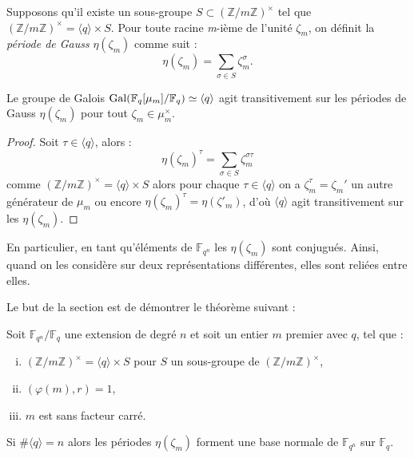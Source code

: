 \documentclass[a4paper]{article} %
\numberwithin{section}{part}
\numberwithin{equation}{section}
\newcommand\nroot[1]{\textit{#1}-ième}
\newcommand\zmodninv[1]{(\mathbb{Z}/#1\mathbb{Z})^{\times}}
\newcommand\GF[1]{\mathbb{F}_{#1}}
\newcommand\groupgen[1]{\langle{#1}\rangle}
\begin{document}
\begin{defn}
Supposons qu'il existe un sous-groupe $S\subset\zmodninv{m}$ tel que
$\zmodninv{m} = \groupgen{q}\times S$. Pour toute racine \nroot{m} de
l'unité $\zeta_m$, on définit la \emph{période de Gauss} $\eta(\zeta_m)$
comme suit :
\begin{equation}
\eta(\zeta_m) = \sum_{\sigma\in S}{\zeta_m^{\sigma}}.
\end{equation}
\end{defn}
\begin{prop}
\label{prop:gaussperconj}
Le groupe de Galois $\textup{Gal}(\GF{q}[\mu_m]/\GF{q})\simeq\groupgen{q}$
agit transitivement sur les périodes de Gauss $\eta(\zeta_m)$ pour tout
$\zeta_m\in\mu_m^{\times}$.
\end{prop}
\begin{proof}
Soit $\tau\in\groupgen{q}$, alors :
\begin{equation}
\eta(\zeta_m)^{\tau} = \sum_{\sigma\in S}{\zeta_m^{\sigma\tau}}
\end{equation}
comme $\zmodninv{m} = \groupgen{q}\times S$ alors pour chaque
$\tau\in\groupgen{q}$ on a $\zeta_m^{\tau} = \zeta_m'$ un autre générateur
de $\mu_m$ ou encore $\eta(\zeta_m)^{\tau} = \eta(\zeta'_m)$, d'où
$\groupgen{q}$ agit transitivement sur les $\eta(\zeta_m)$.
\end{proof}
\begin{rem}
En particulier, en tant qu'éléments de $\GF{q^n}$ les $\eta(\zeta_m)$ sont
conjugués. Ainsi, quand on les considère sur deux représentations différentes,
elles sont reliées entre elles.
\end{rem}
Le but de la section est de démontrer le théorème suivant :

\begin{thm}
\label{th:gausspernorm}
Soit $\GF{q^n}/\GF{q}$ une extension de degré $n$ et soit un entier $m$ premier 
avec $q$, tel que :
\vspace{0.3cm}
\begin{enumerate}[(i)]
    \item $\zmodninv{m} = \groupgen{q}\times S$ pour $S$ un sous-groupe de
        $\zmodninv{m}$,
    \item $(\varphi(m), r) = 1$,
    \item $m$ est sans facteur carré.
\end{enumerate}
\vspace{0.3cm}
Si $\#\groupgen{q} = n$ alors les périodes $\eta(\zeta_m)$ forment une base
normale de $\GF{q^n}$ sur $\GF{q}$.
\end{thm}
\end{document}
